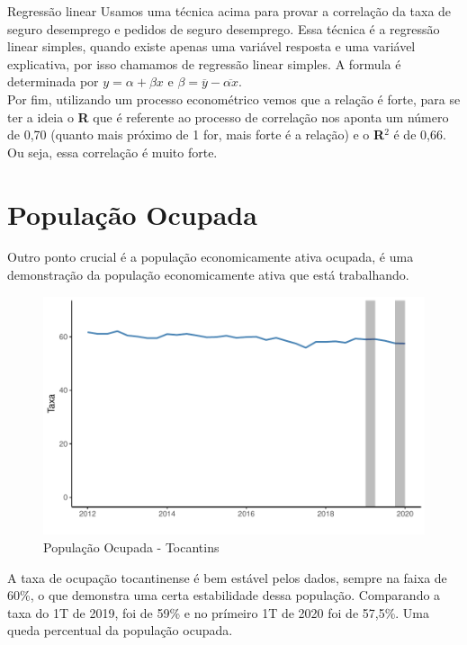 \begin{smbox}[label={labelbox},nameref={Desigualdade por gênero}]{Regressão linear}
	Usamos uma técnica acima para provar a correlação da taxa de seguro desemprego e pedidos de seguro desemprego. Essa técnica é a regressão linear simples, quando existe apenas uma variável resposta e uma variável explicativa, por isso chamamos de regressão linear simples. A formula é determinada por $y = \alpha + \beta x$ e $\beta = \overline{y} - \overline{\alpha x}$.
	\\
	Por fim, utilizando um processo econométrico vemos que a relação é forte, para se ter a ideia o \textbf{R} que é referente ao processo de correlação nos aponta um número de 0,70 (quanto mais próximo de 1 for, mais forte é a relação) e o \textbf{R}$^{2}$ é de 0,66. Ou seja, essa correlação é muito forte. 
\end{smbox}

\section{População Ocupada}

\par Outro ponto crucial é a população economicamente ativa ocupada, é uma demonstração da população economicamente ativa que está trabalhando.

\begin{figure}[h]
	\caption{População Ocupada - Tocantins}
	\includegraphics[width=\linewidth]{fig/População Ocupada.pdf}
\end{figure}

\par  A taxa de ocupação tocantinense é bem estável pelos dados, sempre na faixa de 60\%, o que demonstra uma certa estabilidade dessa população. Comparando a taxa do 1T de 2019, foi de 59\% e no prímeiro 1T de 2020 foi de 57,5\%. Uma queda percentual da população ocupada.

